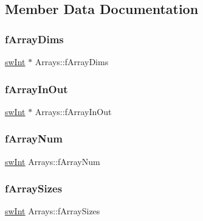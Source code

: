 \subsection{Member Data Documentation}
\mbox{\label{structArrays_a0ea463f279710afff06ffd4856406338}} 
\subsubsection{\texorpdfstring{fArrayDims}{fArrayDims}}
{\footnotesize\ttfamily \mbox{\hyperlink{include_2swMacro_8h_a113cf5f6b5377cdf3fac6aa4e443e9aa}{sw\+Int}} $\ast$ Arrays\+::f\+Array\+Dims}

\mbox{\label{structArrays_a6bbf2ee6da277e3e2c780689fef08768}} 
\subsubsection{\texorpdfstring{fArrayInOut}{fArrayInOut}}
{\footnotesize\ttfamily \mbox{\hyperlink{include_2swMacro_8h_a113cf5f6b5377cdf3fac6aa4e443e9aa}{sw\+Int}} $\ast$ Arrays\+::f\+Array\+In\+Out}

\mbox{\label{structArrays_a7ca77e28c268df2e7cb626afbeb005df}} 
\subsubsection{\texorpdfstring{fArrayNum}{fArrayNum}}
{\footnotesize\ttfamily \mbox{\hyperlink{include_2swMacro_8h_a113cf5f6b5377cdf3fac6aa4e443e9aa}{sw\+Int}} Arrays\+::f\+Array\+Num}

\mbox{\label{structArrays_a0f0308c0b53408426cfc6d036f9f72d0}} 
\subsubsection{\texorpdfstring{fArraySizes}{fArraySizes}}
{\footnotesize\ttfamily \mbox{\hyperlink{include_2swMacro_8h_a113cf5f6b5377cdf3fac6aa4e443e9aa}{sw\+Int}} Arrays\+::f\+Array\+Sizes}

